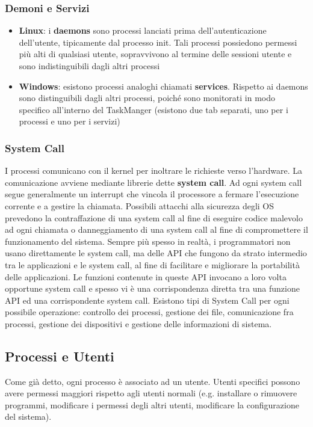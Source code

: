 \subsubsection{Demoni e Servizi}
\begin{itemize}
  \item \textbf{Linux}: i \textbf{daemons} sono processi lanciati prima dell'autenticazione dell'utente, tipicamente dal processo init. Tali processi possiedono permessi più alti di qualsiasi utente, sopravvivono al termine delle sessioni utente e sono indistinguibili dagli altri processi
  \item \textbf{Windows}: esistono processi analoghi chiamati \textbf{services}. Rispetto ai daemons sono distinguibili dagli altri processi, poiché sono monitorati in modo specifico all'interno del TaskManger (esistono due tab separati, uno per i processi e uno per i servizi)
\end{itemize}

\subsubsection{System Call}
I processi comunicano con il kernel per inoltrare le richieste verso l'hardware. La comunicazione avviene mediante librerie dette \textbf{system call}. Ad ogni system call segue generalmente un interrupt che vincola il processore a fermare l'esecuzione corrente e a gestire la chiamata. Possibili attacchi alla sicurezza degli OS prevedono la contraffazione di una system call al fine di eseguire codice malevolo ad ogni chiamata o danneggiamento di una system call al fine di compromettere il funzionamento del sistema. Sempre più spesso in realtà, i programmatori non usano direttamente le system call, ma delle API che fungono da strato intermedio tra le applicazioni e le system call, al fine di facilitare e migliorare la portabilità delle applicazioni. Le funzioni contenute in queste API invocano a loro volta opportune system call e spesso vi è una corrispondenza diretta tra una funzione API ed una corrispondente system call. Esistono tipi di System Call per ogni possibile operazione: controllo dei processi, gestione dei file, comunicazione fra processi, gestione dei dispositivi e gestione delle informazioni di sistema.

\subsection{Processi e Utenti}
Come già detto, ogni processo è associato ad un utente. Utenti specifici possono avere permessi maggiori rispetto agli utenti normali (e.g. installare o rimuovere programmi, modificare i permessi degli altri utenti, modificare la configurazione del sistema). \newline \newline


